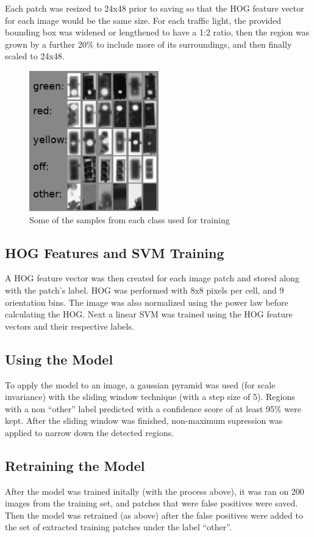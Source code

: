 \documentclass[a4paper]{article}
\begin{document}
Each patch was resized to 24x48 prior to saving so that the HOG feature vector for each image would be the same size.  For each traffic light, the provided bounding box was widened or lengthened to have a 1:2 ratio, then the region was grown by a further 20\% to include more of its surroundings, and then finally scaled to 24x48.

\begin{figure}[!htb]
\centering
\includegraphics[width=0.5\textwidth]{trainingPatches.jpg}
    \caption{\label{fig:masks} Some of the samples from each class used for training}
\end{figure}

\subsection{HOG Features and SVM Training}
A HOG feature vector was then created for each image patch and stored along with the patch's label.  HOG was performed with 8x8 pixels per cell, and 9 orientation bins.  The image was also normalized using the power law before calculating the HOG.  Next a linear SVM was trained using the HOG feature vectors and their respective labels.

\subsection{Using the Model}
To apply the model to an image, a gaussian pyramid was used (for scale invariance) with the sliding window technique (with a step size of 5).  Regions with a non ``other'' label predicted with a confidence score of at least 95\% were kept.  After the sliding window was finished, non-maximum supression was applied to narrow down the detected regions.

\subsection{Retraining the Model}
After the model was trained initally (with the process above), it was ran on 200 images from the training set, and patches that were false positives were saved.  Then the model was retrained (as above) after the false positives were added to the set of extracted training patches under the label ``other''.
\end{document}
